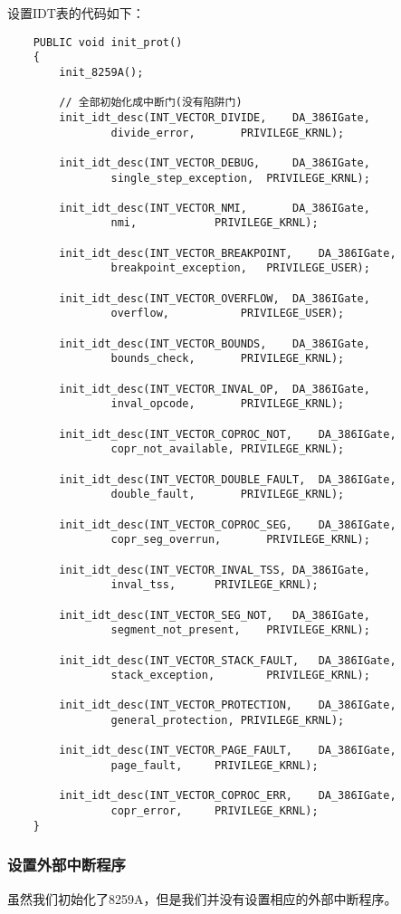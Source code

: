 \documentclass[a4paper,left=2.5cm,right=2.5cm,11pt]{article}
\begin{document}
	设置IDT表的代码如下：
	\begin{lstlisting}
	PUBLIC void init_prot()
	{
		init_8259A();

		// 全部初始化成中断门(没有陷阱门)
		init_idt_desc(INT_VECTOR_DIVIDE,	DA_386IGate,
				divide_error,		PRIVILEGE_KRNL);

		init_idt_desc(INT_VECTOR_DEBUG,		DA_386IGate,
				single_step_exception,	PRIVILEGE_KRNL);

		init_idt_desc(INT_VECTOR_NMI,		DA_386IGate,
				nmi,			PRIVILEGE_KRNL);

		init_idt_desc(INT_VECTOR_BREAKPOINT,	DA_386IGate,
				breakpoint_exception,	PRIVILEGE_USER);

		init_idt_desc(INT_VECTOR_OVERFLOW,	DA_386IGate,
				overflow,			PRIVILEGE_USER);

		init_idt_desc(INT_VECTOR_BOUNDS,	DA_386IGate,
				bounds_check,		PRIVILEGE_KRNL);

		init_idt_desc(INT_VECTOR_INVAL_OP,	DA_386IGate,
				inval_opcode,		PRIVILEGE_KRNL);

		init_idt_desc(INT_VECTOR_COPROC_NOT,	DA_386IGate,
				copr_not_available,	PRIVILEGE_KRNL);

		init_idt_desc(INT_VECTOR_DOUBLE_FAULT,	DA_386IGate,
				double_fault,		PRIVILEGE_KRNL);

		init_idt_desc(INT_VECTOR_COPROC_SEG,	DA_386IGate,
				copr_seg_overrun,		PRIVILEGE_KRNL);

		init_idt_desc(INT_VECTOR_INVAL_TSS,	DA_386IGate,
				inval_tss,		PRIVILEGE_KRNL);

		init_idt_desc(INT_VECTOR_SEG_NOT,	DA_386IGate,
				segment_not_present,	PRIVILEGE_KRNL);

		init_idt_desc(INT_VECTOR_STACK_FAULT,	DA_386IGate,
				stack_exception,		PRIVILEGE_KRNL);

		init_idt_desc(INT_VECTOR_PROTECTION,	DA_386IGate,
				general_protection,	PRIVILEGE_KRNL);

		init_idt_desc(INT_VECTOR_PAGE_FAULT,	DA_386IGate,
				page_fault,		PRIVILEGE_KRNL);

		init_idt_desc(INT_VECTOR_COPROC_ERR,	DA_386IGate,
				copr_error,		PRIVILEGE_KRNL);
	}
	\end{lstlisting}

\subsubsection{设置外部中断程序}
	虽然我们初始化了8259A，但是我们并没有设置相应的外部中断程序。\par
\end{document}
